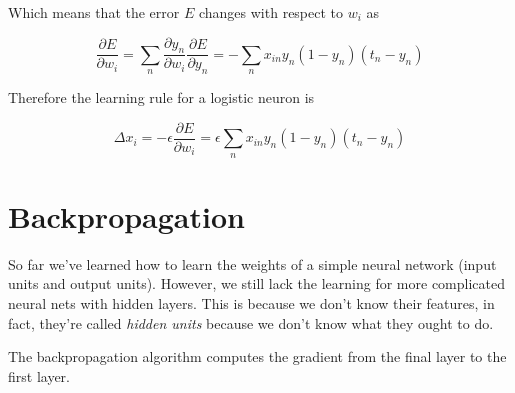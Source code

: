 \documentclass{article}
\begin{document}
Which means that the error \(E\) changes with respect to \(w_i\) as

\[
    \frac{\partial E}{\partial w_i} =
    \sum_n \frac{\partial y_n}{\partial w_i} \frac{\partial E}{\partial y_n} =
    -\sum_n x_{in} y_n (1-y_n)(t_n-y_n)
\]

Therefore the learning rule for a logistic neuron is

\[
    \Delta x_i = -\epsilon \frac{\partial E}{\partial w_i}=\epsilon \sum_n x_{in} y_n (1-y_n)(t_n-y_n)
\]


\pagebreak

\section{Backpropagation}

So far we've learned how to learn the weights of a simple neural network (input units and output units).
However, we still lack the learning for more complicated neural nets with hidden layers.
This is because we don't know their features, in fact, they're called \textit{hidden units}
because we don't know what they ought to do.

The backpropagation algorithm computes the gradient from the final layer to the first layer.

\end{document}
